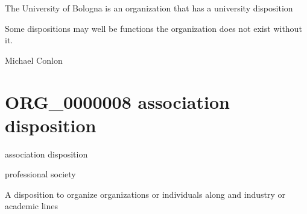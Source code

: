 \documentclass[letterpaper,10pt,english]{sphinxmanual}
\begin{document}
\begin{sphinxShadowBox}

\sphinxAtStartPar
The University of Bologna is an organization that has a university disposition
\end{sphinxShadowBox}

\begin{sphinxShadowBox}

\sphinxAtStartPar
Some dispositions may well be functions \textendash{} the organization does not exist without it.
\end{sphinxShadowBox}

\begin{sphinxShadowBox}

\sphinxAtStartPar
Michael Conlon 
\end{sphinxShadowBox}
\begin{quote}
\label{\detokenize{doc-ORG_0000008:org-0000008}}\label{\detokenize{doc-ORG_0000008:association-disposition}}\label{\detokenize{doc-ORG_0000008:org-0000008}}
\ignorespaces \end{quote}


\section{ORG\_0000008 \sphinxhyphen{} association disposition}
\label{\detokenize{doc-ORG_0000008:org-0000008-association-disposition}}\label{\detokenize{doc-ORG_0000008:index-0}}\label{\detokenize{doc-ORG_0000008::doc}}
\begin{sphinxShadowBox}

\sphinxAtStartPar
association disposition
\end{sphinxShadowBox}

\begin{sphinxShadowBox}

\sphinxAtStartPar
professional society
\end{sphinxShadowBox}

\begin{sphinxShadowBox}

\sphinxAtStartPar
A disposition to organize organizations or individuals along and industry or academic lines
\end{sphinxShadowBox}
\end{document}

